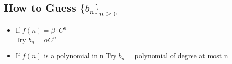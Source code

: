 \documentclass{article}
\begin{document}
\subsection*{How to Guess \(\{b_n\}_{n\geq 0}\)}
\begin{itemize}
\item If \(f(n) = \beta \cdot C^n\) \\
Try \(b_n = \alpha C^n\) 
\item If \(f(n)\) is a polynomial in n 
Try \(b_n\) = polynomial of degree at most n 
\end{itemize}
\end{document}
